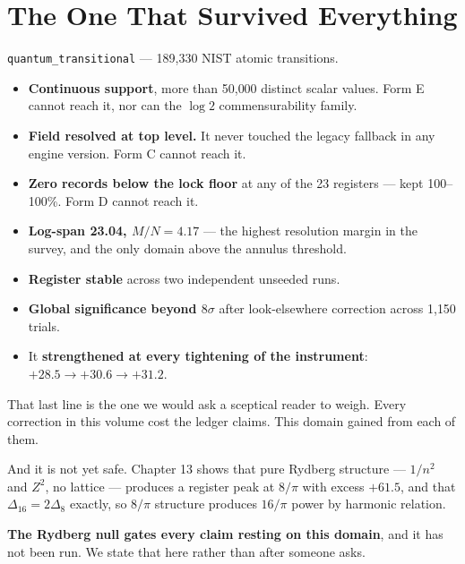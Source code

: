\documentclass[11pt, letterpaper, openany]{book}
\begin{document}
\section{The One That Survived Everything}

\begin{signalbox}
\texttt{quantum\_transitional} --- 189{,}330 NIST atomic transitions.

\begin{itemize}
    \item \textbf{Continuous support}, more than 50{,}000 distinct scalar values. Form E cannot
          reach it, nor can the $\log 2$ commensurability family.
    \item \textbf{Field resolved at top level.} It never touched the legacy fallback in any
          engine version. Form C cannot reach it.
    \item \textbf{Zero records below the lock floor} at any of the 23 registers --- kept
          100--100\%. Form D cannot reach it.
    \item \textbf{Log-span 23.04, $M/N = 4.17$} --- the highest resolution margin in the survey,
          and the only domain above the annulus threshold.
    \item \textbf{Register stable} across two independent unseeded runs.
    \item \textbf{Global significance beyond $8\sigma$} after look-elsewhere correction across
          1{,}150 trials.
    \item It \textbf{strengthened at every tightening of the instrument}: $+28.5 \to +30.6 \to
          +31.2$.
\end{itemize}
\end{signalbox}

That last line is the one we would ask a sceptical reader to weigh. Every correction in this
volume cost the ledger claims. This domain gained from each of them.

\begin{warningbox}
And it is not yet safe. Chapter 13 shows that pure Rydberg structure --- $1/n^2$ and $Z^2$, no
lattice --- produces a register peak at $8/\pi$ with excess $+61.5$, and that
$\Delta_{16} = 2\Delta_8$ exactly, so $8/\pi$ structure produces $16/\pi$ power by harmonic
relation.

\medskip
\noindent \textbf{The Rydberg null gates every claim resting on this domain}, and it has not
been run. We state that here rather than after someone asks.
\end{warningbox}
\end{document}
